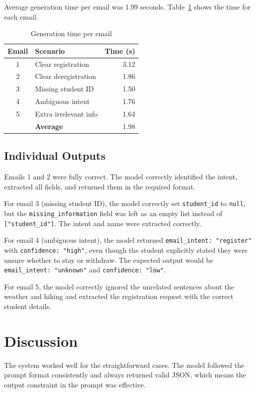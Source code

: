 \documentclass[11pt,a4paper]{article}
\begin{document}
Average generation time per email was 1.99 seconds. Table~\ref{tab:times} shows the time for each email.

\begin{table}[H]
\centering
\caption{Generation time per email}
\label{tab:times}
\begin{tabular}{clr}
\toprule
\textbf{Email} & \textbf{Scenario} & \textbf{Time (s)} \\
\midrule
1 & Clear registration        & 3.12 \\
2 & Clear deregistration      & 1.86 \\
3 & Missing student ID        & 1.50 \\
4 & Ambiguous intent          & 1.76 \\
5 & Extra irrelevant info     & 1.64 \\
\midrule
  & \textbf{Average}          & 1.98 \\
\bottomrule
\end{tabular}
\end{table}

\subsection{Individual Outputs}

Emails 1 and 2 were fully correct. The model correctly identified the intent, extracted all fields, and returned them in the required format.

For email 3 (missing student ID), the model correctly set \texttt{student\_id} to \texttt{null}, but the \texttt{missing\_information} field was left as an empty list instead of \texttt{["student\_id"]}. The intent and name were extracted correctly.

For email 4 (ambiguous intent), the model returned \texttt{email\_intent: "register"} with \texttt{confidence: "high"}, even though the student explicitly stated they were unsure whether to stay or withdraw. The expected output would be \texttt{email\_intent: "unknown"} and \texttt{confidence: "low"}.

For email 5, the model correctly ignored the unrelated sentences about the weather and hiking and extracted the registration request with the correct student details.

\section{Discussion}

The system worked well for the straightforward cases. The model followed the prompt format consistently and always returned valid JSON, which means the output constraint in the prompt was effective.
\end{document}
